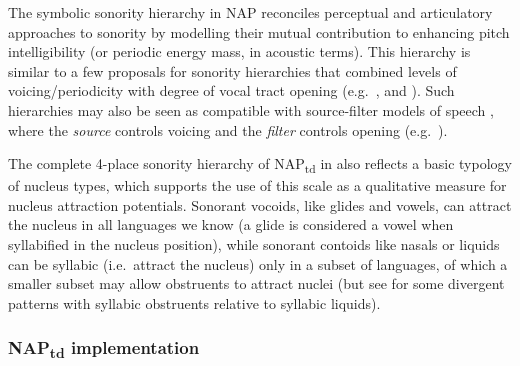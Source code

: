 The symbolic sonority hierarchy in NAP reconciles perceptual and articulatory approaches to sonority by modelling their mutual contribution to enhancing pitch intelligibility (or periodic energy mass, in acoustic terms). This hierarchy is similar to a few proposals for sonority hierarchies that combined levels of voicing/periodicity with degree of vocal tract opening (e.g.~\citealt{lass1988phonology, miller2012sonority}, and \citealt{sharma2018significance}). Such hierarchies may also be seen as compatible with source-filter models of speech \citep{fant1960acousticsk}, where the \emph{source} controls voicing and the \emph{filter} controls opening (e.g.~\citealt{puppel1992sonority}).

The complete 4-place sonority hierarchy of NAP\textsubscript{td} in  also reflects a basic typology of nucleus types, which supports the use of this scale as a qualitative measure for nucleus attraction potentials. Sonorant vocoids, like glides and vowels, can attract the nucleus in all languages we know (a glide is considered a vowel when syllabified in the nucleus position), while sonorant contoids like nasals or liquids can be syllabic (i.e.~attract the nucleus) only in a subset of languages, of which a smaller subset may allow obstruents to attract nuclei (but see \citealt{easterday2019highly} for some divergent patterns with syllabic obstruents relative to syllabic liquids).

\subsubsection{NAP\textsubscript{td} implementation}\label{sec:snapimplementation}\largerpage[-2]

